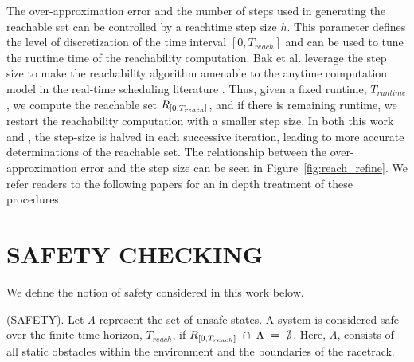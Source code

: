 \documentclass[manuscript,screen,review]{acmart}
\newcommand{\figref}[1]{Figure~\ref{#1}}
\begin{document}
The over-approximation error and the number of steps used in generating the reachable set can be controlled by a reachtime step size $h$. This parameter defines the level of discretization of the time interval $[0,T_{reach}]$ and can be used to tune the runtime time of the reachability computation. Bak et al. leverage the step size to make the reachability algorithm amenable to the anytime computation model in the real-time scheduling literature \cite{Liu1991}. Thus, given a fixed runtime, $T_{runtime}$, we compute the reachable set $\mathnormal{R}_{[0,T_{reach}]}$, and if there is remaining runtime, we restart the reachability computation with a smaller step size. In both this work and \cite{Bak2014}, the step-size is halved in each successive iteration, leading to more accurate determinations of the reachable set. The relationship between the over-approximation error and the step size can be seen in \figref{fig:reach_refine}. We refer readers to the following papers for an in depth treatment of these procedures \cite{dang2000,Bak2014,Johnson2016}.










\section{SAFETY CHECKING}

We define the notion of safety considered in this work below. \smallskip
\begin{definition}%
(SAFETY). Let $\Lambda$ represent the set of unsafe states. A system is considered safe over the finite time horizon, $T_{reach}$, if  $\mathnormal{R}_{[0,T_{reach}]} \  \cap \ \Lambda \ = \ \emptyset$. Here, $\Lambda$, consists of all static obstacles within the environment and the boundaries of the racetrack.
\end{definition}%
\end{document}
